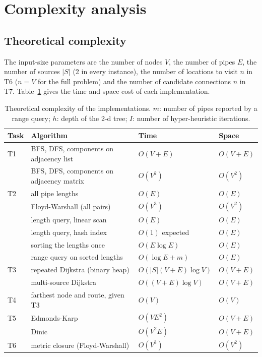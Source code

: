 \section{Complexity analysis}\label{sec:complexity}

\subsection{Theoretical complexity}
The input-size parameters are the number of nodes $V$, the number of pipes $E$, the number of sources $|S|$ (2 in every instance), the number of locations to visit $n$ in T6 ($n=V$ for the full problem) and the number of candidate connections $n$ in T7. Table~\ref{tab:theory} gives the time and space cost of each implementation.

\begin{table}[H]
\centering\small
\caption{Theoretical complexity of the implementations. $m$: number of pipes reported by a range query; $h$: depth of the 2-d tree; $I$: number of hyper-heuristic iterations.}\label{tab:theory}
\begin{tabular}{llll}
\toprule
Task & Algorithm & Time & Space \\
\midrule
T1 & BFS, DFS, components on adjacency list & $O(V+E)$ & $O(V+E)$ \\
   & BFS, DFS, components on adjacency matrix & $O(V^2)$ & $O(V^2)$ \\
T2 & all pipe lengths & $O(E)$ & $O(E)$ \\
   & Floyd-Warshall (all pairs) & $O(V^3)$ & $O(V^2)$ \\
   & length query, linear scan & $O(E)$ & $O(E)$ \\
   & length query, hash index & $O(1)$ expected & $O(E)$ \\
   & sorting the lengths once & $O(E\log E)$ & $O(E)$ \\
   & range query on sorted lengths & $O(\log E+m)$ & $O(E)$ \\
T3 & repeated Dijkstra (binary heap) & $O(|S|(V+E)\log V)$ & $O(V+E)$ \\
   & multi-source Dijkstra & $O((V+E)\log V)$ & $O(V+E)$ \\
T4 & farthest node and route, given T3 & $O(V)$ & $O(V)$ \\
T5 & Edmonds-Karp & $O(VE^2)$ & $O(V+E)$ \\
   & Dinic & $O(V^2E)$ & $O(V+E)$ \\
T6 & metric closure (Floyd-Warshall) & $O(V^3)$ & $O(V^2)$ \\

\end{tabular}
\end{table}
